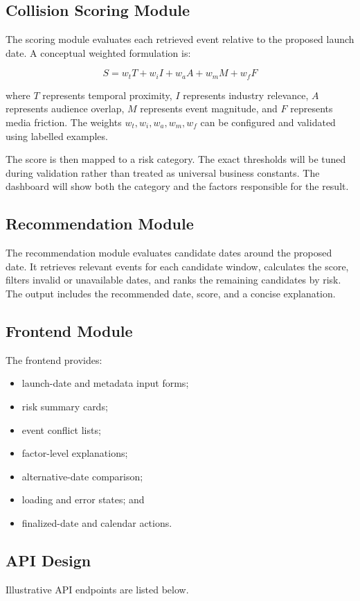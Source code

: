 \documentclass[12pt]{article}
\begin{document}
\subsection{Collision Scoring Module}
The scoring module evaluates each retrieved event relative to the proposed launch date. A conceptual weighted formulation is:

\[
S = w_tT + w_iI + w_aA + w_mM + w_fF
\]

where $T$ represents temporal proximity, $I$ represents industry relevance, $A$ represents audience overlap, $M$ represents event magnitude, and $F$ represents media friction. The weights $w_t,w_i,w_a,w_m,w_f$ can be configured and validated using labelled examples.

The score is then mapped to a risk category. The exact thresholds will be tuned during validation rather than treated as universal business constants. The dashboard will show both the category and the factors responsible for the result.

\subsection{Recommendation Module}
The recommendation module evaluates candidate dates around the proposed date. It retrieves relevant events for each candidate window, calculates the score, filters invalid or unavailable dates, and ranks the remaining candidates by risk. The output includes the recommended date, score, and a concise explanation.

\subsection{Frontend Module}
The frontend provides:
\begin{itemize}[leftmargin=0.7cm]
\item launch-date and metadata input forms;
\item risk summary cards;
\item event conflict lists;
\item factor-level explanations;
\item alternative-date comparison;
\item loading and error states; and
\item finalized-date and calendar actions.
\end{itemize}

\subsection{API Design}
Illustrative API endpoints are listed below.
\end{document}
